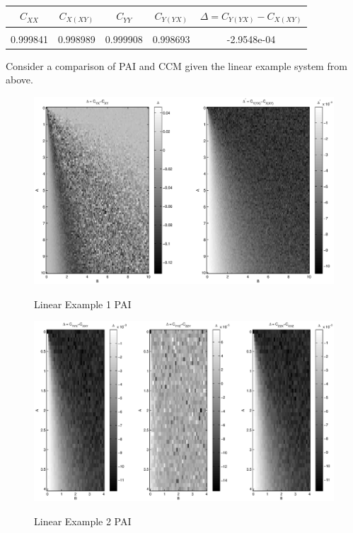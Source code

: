 \documentclass[a4paper,11pt]{article}
\begin{document}
\begin{tabular}{c|c|c|c|c}
$C_{XX}$ & $C_{X(XY)}$ & $C_{YY}$ & $C_{Y(YX)}$ & $\Delta=C_{Y(YX)}-C_{X(XY)}$ \\
\hline \\
0.999841 & 0.998989 & 0.999908 & 0.998693 & -2.9548e-04
\end{tabular}

Consider a comparison of PAI and CCM given the linear example system from above.  
\begin{figure}[H]
\includegraphics[scale=0.6]{RLCircuitPlots/LinearEx_PAI.eps} \\
\caption{Linear Example 1 PAI}
\label{fig1}
\end{figure}

\begin{figure}[H]
\includegraphics[scale=0.6]{RLCircuitPlots/LinearXYZPAIEx.eps} \\
\caption{Linear Example 2 PAI}
\label{fig2}
\end{figure}
\end{document}
